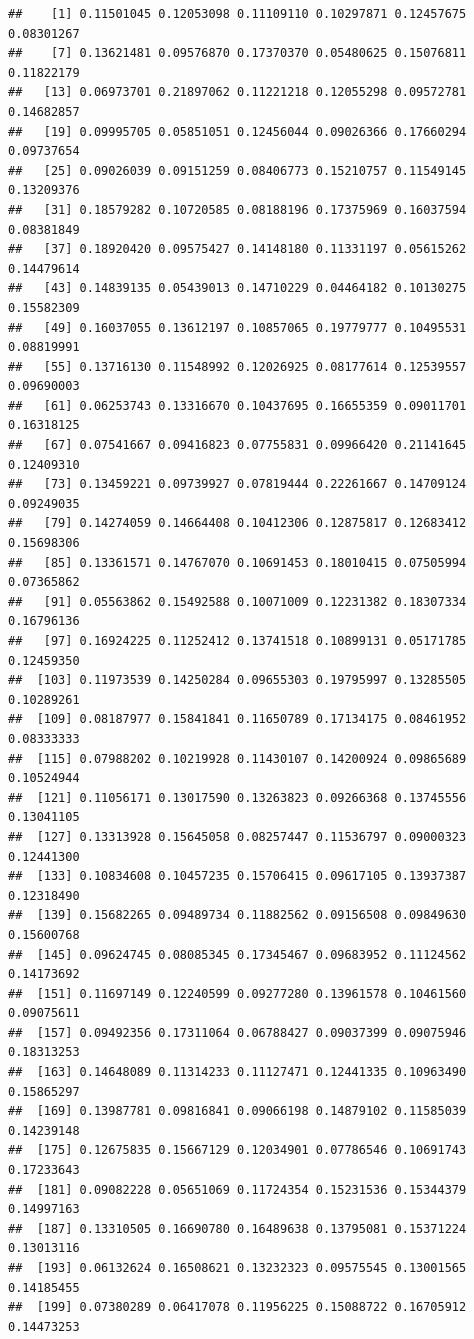 \documentclass[
]{article}
\begin{document}
\begin{verbatim}
##    [1] 0.11501045 0.12053098 0.11109110 0.10297871 0.12457675 0.08301267
##    [7] 0.13621481 0.09576870 0.17370370 0.05480625 0.15076811 0.11822179
##   [13] 0.06973701 0.21897062 0.11221218 0.12055298 0.09572781 0.14682857
##   [19] 0.09995705 0.05851051 0.12456044 0.09026366 0.17660294 0.09737654
##   [25] 0.09026039 0.09151259 0.08406773 0.15210757 0.11549145 0.13209376
##   [31] 0.18579282 0.10720585 0.08188196 0.17375969 0.16037594 0.08381849
##   [37] 0.18920420 0.09575427 0.14148180 0.11331197 0.05615262 0.14479614
##   [43] 0.14839135 0.05439013 0.14710229 0.04464182 0.10130275 0.15582309
##   [49] 0.16037055 0.13612197 0.10857065 0.19779777 0.10495531 0.08819991
##   [55] 0.13716130 0.11548992 0.12026925 0.08177614 0.12539557 0.09690003
##   [61] 0.06253743 0.13316670 0.10437695 0.16655359 0.09011701 0.16318125
##   [67] 0.07541667 0.09416823 0.07755831 0.09966420 0.21141645 0.12409310
##   [73] 0.13459221 0.09739927 0.07819444 0.22261667 0.14709124 0.09249035
##   [79] 0.14274059 0.14664408 0.10412306 0.12875817 0.12683412 0.15698306
##   [85] 0.13361571 0.14767070 0.10691453 0.18010415 0.07505994 0.07365862
##   [91] 0.05563862 0.15492588 0.10071009 0.12231382 0.18307334 0.16796136
##   [97] 0.16924225 0.11252412 0.13741518 0.10899131 0.05171785 0.12459350
##  [103] 0.11973539 0.14250284 0.09655303 0.19795997 0.13285505 0.10289261
##  [109] 0.08187977 0.15841841 0.11650789 0.17134175 0.08461952 0.08333333
##  [115] 0.07988202 0.10219928 0.11430107 0.14200924 0.09865689 0.10524944
##  [121] 0.11056171 0.13017590 0.13263823 0.09266368 0.13745556 0.13041105
##  [127] 0.13313928 0.15645058 0.08257447 0.11536797 0.09000323 0.12441300
##  [133] 0.10834608 0.10457235 0.15706415 0.09617105 0.13937387 0.12318490
##  [139] 0.15682265 0.09489734 0.11882562 0.09156508 0.09849630 0.15600768
##  [145] 0.09624745 0.08085345 0.17345467 0.09683952 0.11124562 0.14173692
##  [151] 0.11697149 0.12240599 0.09277280 0.13961578 0.10461560 0.09075611
##  [157] 0.09492356 0.17311064 0.06788427 0.09037399 0.09075946 0.18313253
##  [163] 0.14648089 0.11314233 0.11127471 0.12441335 0.10963490 0.15865297
##  [169] 0.13987781 0.09816841 0.09066198 0.14879102 0.11585039 0.14239148
##  [175] 0.12675835 0.15667129 0.12034901 0.07786546 0.10691743 0.17233643
##  [181] 0.09082228 0.05651069 0.11724354 0.15231536 0.15344379 0.14997163
##  [187] 0.13310505 0.16690780 0.16489638 0.13795081 0.15371224 0.13013116
##  [193] 0.06132624 0.16508621 0.13232323 0.09575545 0.13001565 0.14185455
##  [199] 0.07380289 0.06417078 0.11956225 0.15088722 0.16705912 0.14473253

\end{verbatim}
\end{document}
